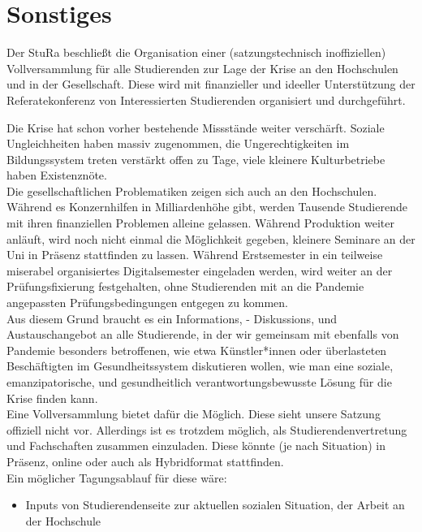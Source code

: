 \section{Sonstiges} %
{
    Der StuRa beschließt die Organisation einer (satzungstechnisch inoffiziellen) Vollversammlung
    für alle Studierenden zur Lage der Krise an den Hochschulen und in der Gesellschaft.
    Diese wird mit finanzieller und ideeller Unterstützung der Referatekonferenz von Interessierten
    Studierenden organisiert und durchgeführt. 
}{
    Die Krise hat schon vorher bestehende Missstände weiter verschärft. Soziale Ungleichheiten haben
    massiv zugenommen, die Ungerechtigkeiten im Bildungssystem treten verstärkt offen zu Tage, viele
    kleinere Kulturbetriebe haben Existenznöte.\\
    Die gesellschaftlichen Problematiken zeigen sich auch an den Hochschulen. Während es Konzernhilfen
    in Milliardenhöhe gibt, werden Tausende Studierende mit ihren finanziellen Problemen alleine
    gelassen. Während Produktion weiter anläuft, wird noch nicht einmal die Möglichkeit gegeben,
    kleinere Seminare an der Uni in Präsenz stattfinden zu lassen. Während Erstsemester in ein
    teilweise miserabel organisiertes Digitalsemester eingeladen werden, wird weiter an der
    Prüfungsfixierung festgehalten, ohne Studierenden mit an die Pandemie angepassten Prüfungsbedingungen
    entgegen zu kommen.\\
    Aus diesem Grund braucht es ein Informations, - Diskussions, und Austauschangebot an alle 
    Studierende, in der wir gemeinsam mit ebenfalls von Pandemie besonders betroffenen, wie etwa
    Künstler*innen oder überlasteten Beschäftigten im Gesundheitssystem diskutieren wollen, wie man eine
    soziale, emanzipatorische, und gesundheitlich verantwortungsbewusste Lösung für die Krise finden
    kann.\\
    Eine Vollversammlung bietet dafür die Möglich. Diese sieht unsere Satzung offiziell nicht vor.
    Allerdings ist es trotzdem möglich, als Studierendenvertretung und Fachschaften zusammen einzuladen.
    Diese könnte (je nach Situation) in Präsenz, online oder auch als Hybridformat stattfinden.\\
    Ein möglicher Tagungsablauf für diese wäre:\\
    \begin{itemize}
        \item Inputs von Studierendenseite zur aktuellen sozialen Situation, der Arbeit an der Hochschule

\end{itemize}}
